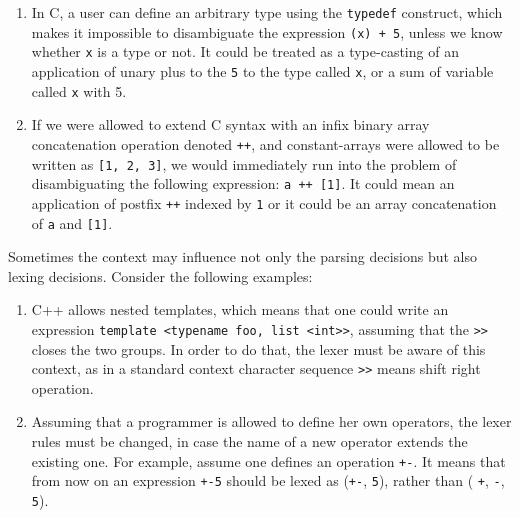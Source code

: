 \begin{enumerate}
    \item %
          In C, a user can define an arbitrary type using the
          \verb|typedef| construct, which makes it impossible 
          to disambiguate the expression \verb|(x) + 5|, unless
          we know whether \verb|x| is a type or not. It could
          be treated as a type-casting of an application of unary
          plus to the \verb|5| to the type called \verb|x|,
          or a sum of variable called \verb|x| with 5.
    \item If we were allowed to extend C syntax with an infix 
          binary array concatenation operation denoted \verb|++|, and
          constant-arrays were allowed to be written as 
          \verb|[1, 2, 3]|,
          we  would immediately run into the problem of disambiguating
          the following expression: \verb|a ++ [1]|.  It could mean
          an application of postfix \verb|++| indexed by \verb|1|
          or it could be an array concatenation of \verb|a| and 
          \verb|[1]|.
\end{enumerate}

\noindent
Sometimes the context may influence not only the parsing decisions but 
also lexing decisions.  Consider the following examples:
\begin{enumerate}
    \item C++ allows nested templates, which means that one could
          write an expression \verb|template <typename foo, list <int>>|, 
          assuming that the \verb|>>| closes the two groups.  In
          order to do that, the lexer must be aware of this context,
          as in a standard context character sequence \verb|>>| means
          shift right operation.
    \item Assuming that a programmer is allowed to define her own 
          operators, the lexer rules must be changed, in case 
          the name of a new operator extends the existing one.  For
          example, assume one defines an operation \verb|+-|.
          It means that from now on an expression \verb|+-5| should
          be lexed as (\verb|+-|, \verb|5|), rather than (%
          \verb|+|, \verb|-|, \verb|5|).
\end{enumerate}

